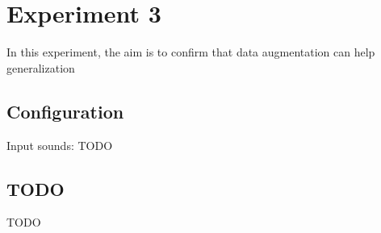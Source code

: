 \section{Experiment 3}
In this experiment, the aim is to confirm that data augmentation can help generalization

\subsection{Configuration}
Input sounds: TODO

\subsection{TODO}
TODO